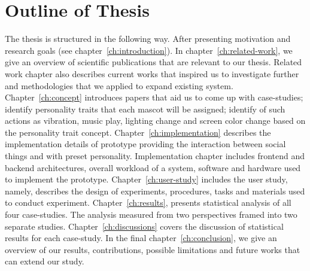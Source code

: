 \section{Outline of Thesis}
\label{sec:outline-of-thesis}
The thesis is structured in the following way.
After presenting motivation and research goals (see chapter~\ref{ch:introduction}).
In chapter~\ref{ch:related-work}, we give an overview of scientific publications that are relevant to our thesis.
Related work chapter also describes current works that inspired us to investigate further
and methodologies that we applied to expand existing system.
Chapter~\ref{ch:concept} introduces papers that aid us to come up with case-studies;
identify personality traits that each mascot will be assigned;
identify of such actions as vibration, music play, lighting change
and screen color change based on the personality trait concept.
Chapter~\ref{ch:implementation} describes the implementation details of prototype providing the
interaction between social things and with preset personality.
Implementation chapter includes frontend and backend architectures,
overall workload of a system, software and hardware used to implement the prototype.
Chapter~\ref{ch:user-study} includes the user study, namely, describes the design of
experiments, procedures, tasks and materials used to conduct experiment.
Chapter~\ref{ch:results}, presents statistical analysis of all four case-studies.
The analysis measured from two perspectives framed into two separate studies.
Chapter~\ref{ch:discussions} covers the discussion of statistical results for each case-study.
In the final chapter~\ref{ch:conclusion}, we give an overview of our results, contributions,
possible limitations and future works that can extend our study.